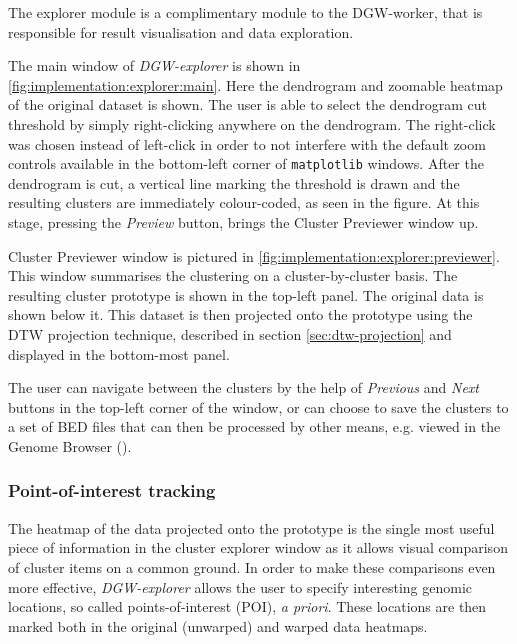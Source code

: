 \documentclass[parskip]{cs4rep}
\newcommand{\pythonpackage}[1]{{\tt #1}}
\begin{document}
The explorer module is a complimentary module to the DGW-worker, that is responsible for result
visualisation and data exploration.

The main window of \emph{DGW-explorer} is shown in \autoref{fig:implementation:explorer:main}.
Here the dendrogram and zoomable heatmap of the original dataset is shown. The user is able to select the dendrogram cut threshold by simply right-clicking anywhere on the dendrogram. 
The right-click was chosen instead of left-click in order to not interfere with the default zoom controls available in the bottom-left corner of \pythonpackage{matplotlib} windows. After the dendrogram is cut, a vertical line marking the threshold is drawn and the resulting clusters are immediately colour-coded, as seen in the figure. At this stage, pressing the \emph{Preview} button, brings the Cluster Previewer window up.
 
Cluster Previewer window is pictured in \autoref{fig:implementation:explorer:previewer}.
This window summarises the clustering on a cluster-by-cluster basis. The resulting cluster prototype is shown in the top-left panel. The original data is shown below it. This dataset is then projected onto the prototype using the DTW projection technique, described in section \ref{sec:dtw-projection} and displayed in the bottom-most panel.

 The user can navigate between the clusters by the help of \emph{Previous} and \emph{Next} buttons in the top-left corner of the window, or can choose to save the clusters to a set of BED files that can then be processed by other means, e.g. viewed in the Genome Browser (\cite{Kent:2002wd}).

\subsubsection{Point-of-interest tracking}
\label{sec:poi-tracking}

The heatmap of the data projected onto the prototype is the single most useful piece of information in the cluster explorer window as it allows visual comparison of cluster items on a common ground.
In order to make these comparisons even more effective, \emph{DGW-explorer} allows the user to specify interesting genomic locations, so called points-of-interest (POI), \emph{a priori}. These locations are then marked both in the original (unwarped) and warped data heatmaps.
\end{document}
